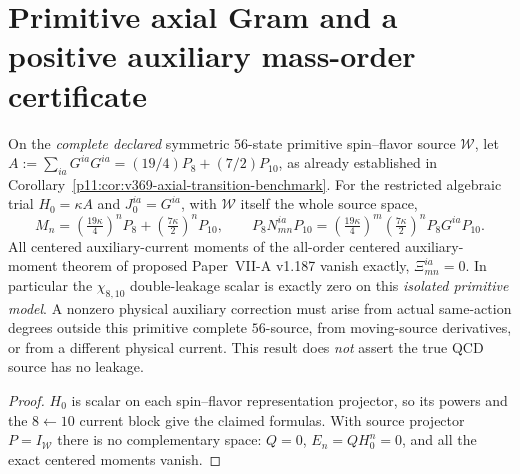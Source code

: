 \documentclass[12pt,a4paper]{article}
\begin{document}
\section{Primitive axial Gram and a positive auxiliary mass-order certificate}
\label{p11:sec:v377-positive-gram-boundary}
\begin{proposition}
\label{p11:prop:v377-primitive-gram-zero-centered}
On the \emph{complete declared} symmetric $56$-state primitive
spin--flavor source $\mathcal W$, let
$A:=\sum_{ia}G^{ia}G^{ia}=(19/4)P_8+(7/2)P_{10}$, as already
established in Corollary~\ref{p11:cor:v369-axial-transition-benchmark}.
For the restricted algebraic trial $H_0=\kappa A$ and
$J_0^{ia}=G^{ia}$, with $\mathcal W$ itself the whole source space,
\[
\boxed{M_n=\left(\tfrac{19\kappa}{4}\right)^nP_8
 +\left(\tfrac{7\kappa}{2}\right)^nP_{10},\qquad
 P_8N_{mn}^{ia}P_{10}
 =\left(\tfrac{19\kappa}{4}\right)^m
  \left(\tfrac{7\kappa}{2}\right)^n P_8G^{ia}P_{10}.}
\]
All centered auxiliary-current moments of
the all-order centered auxiliary-moment theorem of proposed Paper~VII-A v1.187
vanish exactly, $\Xi_{mn}^{ia}=0$. In particular the
$\chi_{8,10}$ double-leakage scalar is exactly zero on this
\emph{isolated primitive model}. A nonzero physical auxiliary
correction must arise from actual same-action degrees outside this
primitive complete $56$-source, from moving-source derivatives, or
from a different physical current. This result does \emph{not}
assert the true QCD source has no leakage.
\end{proposition}
\begin{proof}
$H_0$ is scalar on each spin--flavor representation projector,
so its powers and the $8\leftarrow10$ current block give the
claimed formulas. With source projector $P=I_{\mathcal W}$
there is no complementary space: $Q=0$, $E_n=QH_0^n=0$, and
all the exact centered moments vanish.
\end{proof}
\end{document}
